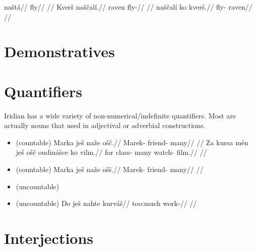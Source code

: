 \pex
\a
\begingl
\gla na\v{s}t\'a//
\glb fly//
\glft {}//
\endgl
\a
\begingl
\gla Kver\v{s} na\v{s}\v{c}al\'i.//
\glb raven fly-//
\glft {}//
\endgl
\a
\begingl
\gla na\v{s}\v{c}al\'i ko kver\v{s}.//
\glb fly-  raven//
\glft {}//
\endgl
\xe

\section{Demonstratives}\label{dem-adj}

\section{Quantifiers}
Iridian has a wide variety of non-numerical/indefinite quantifiers.  Most are actually nouns that used in adjectival or adverbial constructions.


\begin{itemize}
    \item {}  (countable)
    \ex
    \begingl
    \gla Marka je\v{s} na\v{z}e o\v{s}\v{c}.//
    \glb Marek-  friend- many//
    \glft {}//
    \endgl
    \xe
    \ex
    \begingl
    \gla Za kursa m\'en je\v{s} o\v{s}\v{c} oudin\'a\v{s}ce ko vilm.//
    \glb for class-   many watch-  film.//
    \glft {}//
    \endgl
    \xe
    \item {}  (countable)
    \ex
    \begingl
    \gla Marka je\v{s} na\v{z}e o\v{s}\v{s}.//
    \glb Marek-  friend- many//
    \glft {}//
    \endgl
    \xe
    \item {}  (uncountable)
    \item {}  (uncountable)
    \ex
    \begingl
    \gla Do je\v{s} nahte kurv\'a\v{s}//
    \glb {}  too:much work-//
    \glft {}//
    \endgl
    \xe

\end{itemize}

\section{Interjections}

